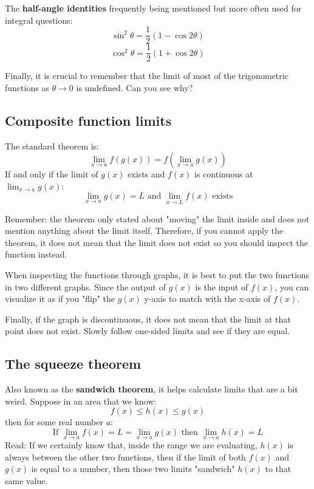 The \textbf{half-angle identities} frequently being mentioned but more often used for integral questions:
\begin{equation}
    \sin^2\theta = \frac{1}{2}(1-\cos2\theta)
\end{equation}
\begin{equation}
    \cos^2\theta = \frac{1}{2}(1+\cos2\theta)
\end{equation}

Finally, it is crucial to remember that the limit of most of the trigonometric functions as $\theta\to0$ is undefined. Can you see why?

\subsection{Composite function limits}
The standard theorem is:
\begin{equation}
    \lim_{x\to a} f(g(x))
    = f(\lim_{x\to a} g(x))
\end{equation}
If and only if the limit of $g(x)$ exists and $f(x)$ is continuous at $\lim_{x\to a} g(x)$:
\[
    \lim_{x\to a}g(x) = L
    \text{ and }
    \lim_{x\to L} f(x) \text { exists}
\]

Remember: the theorem only stated about "moving" the limit inside and does not mention anything about the limit itself. Therefore, if you cannot apply the theorem, it does not mean that the limit does not exist so you should inspect the function instead. 

When inspecting the functions through graphs, it is best to put the two functions in two different graphs. Since the output of $g(x)$ is the input of $f(x)$, you can visualize it as if you "flip" the $g(x)$ y-axis to match with the x-axis of $f(x)$.

Finally, if the graph is discontinuous, it does not mean that the limit at that point does not exist. Slowly follow one-sided limits and see if they are equal.

\subsection{The squeeze theorem}
Also known as the \textbf{sandwich theorem}, it helps calculate limits that are a bit weird. Suppose in an area that we know:
\[ f(x) \leq h(x) \leq g(x) \]
then for some real number $a$:
\begin{equation}
    \text{If } \lim_{x\to a}f(x) = L = \lim_{x\to a}g(x)
    \text{ then }
    \lim_{x\to a}h(x) = L
\end{equation}
Read: If we certainly know that, inside the range we are evaluating, $h(x)$ is always between the other two functions, then if the limit of both $f(x)$ and $g(x)$ is equal to a number, then those two limits "sandwich" $h(x)$ to that same value.

